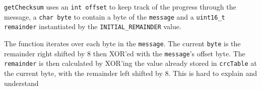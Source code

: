 \texttt{getChecksum} uses an \texttt{int offset} to keep track of the progress through the message, a \texttt{char byte} to contain a byte of the \texttt{message} and a \texttt{uint16\_t remainder} instantiated by the \texttt{INITIAL\_REMAINDER} value. 

The function iterates over each byte in the \texttt{message}. The current \texttt{byte} is the remainder right shifted by 8 then XOR'ed with the \texttt{message}'s offset byte. The \texttt{remainder} is then calculated by XOR'ing the value already stored in \texttt{crcTable} at the current byte, with the remainder left shifted by 8. This is hard to explain and understand 